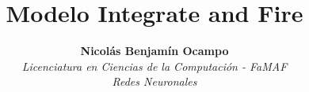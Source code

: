 \documentclass[10pt,journal,compsoc]{IEEEtran}
\begin{document}
%
\title{Modelo Integrate and Fire}
%
%
%
%

\author{\textbf{Nicolás Benjamín Ocampo}\\
\textit{Licenciatura en Ciencias de la Computación - FaMAF}\\
\textit{Redes Neuronales}
}

%
%
\end{document}
